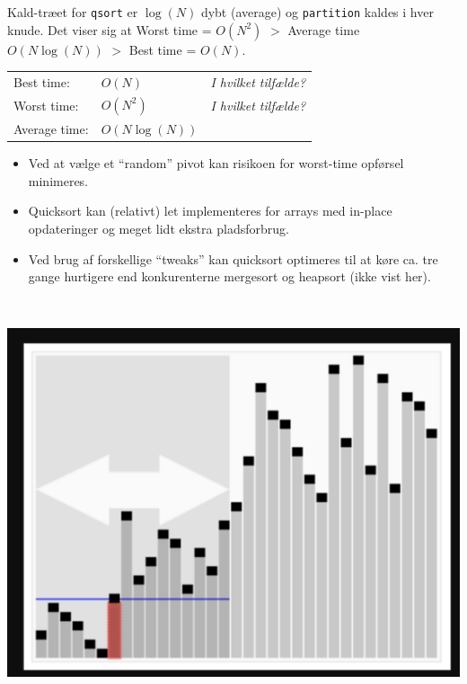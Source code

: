 \documentclass[rgb]{beamer}
\begin{document}
\begin{frame}[fragile]
\begin{footnotesize}

  Kald-træet for \lstinline{qsort} er $\log(N)$ dybt (average) og
  \lstinline{partition} kaldes i hver knude. Det viser sig at Worst time = $O(N^2)$ $>$
  Average time $O(N\log(N))$ $>$ Best time = $O(N)$.

\vspace{1ex}

\begin{minipage}[b]{0.55\textwidth}


\vspace{1ex}
  \begin{tabular}{lll}
    Best time: & $O(N)$ & \emph{I hvilket tilfælde?} \\
    Worst time: & $O(N^2)$ & \emph{I hvilket tilfælde?} \\
    Average time: & $O(N\log(N))$
  \end{tabular}

  \vspace{1ex}
  \begin{itemize}
  \item Ved at vælge et ``random'' pivot kan risikoen for worst-time opførsel minimeres.
  \item Quicksort kan (relativt) let implementeres for arrays med in-place opdateringer og meget lidt ekstra pladsforbrug.
  \item Ved brug af forskellige ``tweaks'' kan quicksort optimeres til
    at køre ca. tre gange hurtigere end konkurenterne mergesort og
    heapsort (ikke vist her).
  \end{itemize}
  \vfill
\mbox{ }
\end{minipage} \hspace{1cm}
\begin{minipage}[b]{0.3\textwidth}

  \includegraphics[width=\textwidth]{../images/qsort_gif.png}


\end{minipage}
\end{footnotesize}
\end{frame}
\end{document}

